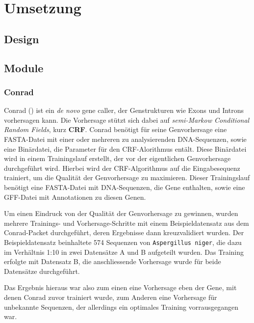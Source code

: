 \chapter{Umsetzung}
\section{Design}
\section{Module}
\subsection{Conrad}
Conrad
()
ist ein \textit{de novo} gene caller, der Genstrukturen wie Exons und Introns
vorhersagen kann.
 
Die Vorhersage stützt sich dabei auf \textit{semi-Markow Conditional Random
Fields}, kurz \textbf{CRF}.  %
  
Conrad benötigt für seine Genvorhersage eine FASTA-Datei mit einer oder
mehreren zu analysierenden DNA-Sequenzen, sowie eine Binärdatei, die Parameter
für den CRF-Alorithmus entält.
Diese Binärdatei wird in einem Trainingslauf erstellt, der vor der
eigentlichen Genvorhersage durchgeführt wird. Hierbei wird der CRF-Algorithmus
auf die Eingabesequenz trainiert, um die Qualität der Genvorhersage
zu maximieren. Dieser Trainingslauf benötigt eine FASTA-Datei mit
DNA-Sequenzen, die Gene enthalten, sowie eine GFF-Datei mit Annotationen zu
diesen Genen.

Um einen Eindruck von der Qualität der Genvorhersage zu gewinnen, wurden
mehrere Trainings- und Vorhersage-Schritte mit einem Beispieldatensatz aus dem
Conrad-Packet durchgeführt, deren Ergebnisse dann kreuzvalidiert wurden.
Der Beispieldatensatz beinhaltete 574 Sequenzen von \texttt{Aspergillus niger},
die dazu im Verhältnis 1:10 in zwei Datensätze A und B aufgeteilt wurden.
Das Training erfolgte mit Datensatz B, die anschliessende Vorhersage wurde für
beide Datensätze durchgeführt.

Das Ergebnis hieraus war also zum einen eine Vorhersage eben der Gene, mit
denen Conrad zuvor trainiert wurde, zum Anderen eine Vorhersage für unbekannte
Sequenzen, der allerdings ein optimales Training vorrausgegangen war.

